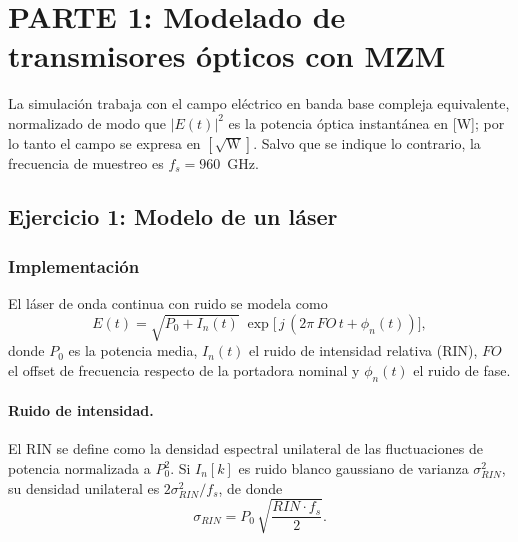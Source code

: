 
\section*{PARTE 1: Modelado de transmisores ópticos con MZM}

La simulación trabaja con el campo eléctrico en banda base compleja
equivalente, normalizado de modo que $|E(t)|^2$ es la potencia óptica
instantánea en [W]; por lo tanto el campo se expresa en $[\sqrt{\text{W}}]$.
Salvo que se indique lo contrario, la frecuencia de muestreo es
$f_s = 960$~GHz.

\subsection*{Ejercicio 1: Modelo de un láser}

\subsubsection*{Implementación}

El láser de onda continua con ruido se modela como
%
\begin{equation}
E(t) = \sqrt{P_0 + I_n(t)}\;\exp\!\big[\,j\,(2\pi\,FO\,t + \phi_n(t))\big],
\label{eq:ej1_laser}
\end{equation}
%
donde $P_0$ es la potencia media, $I_n(t)$ el ruido de intensidad relativa
(RIN), $FO$ el offset de frecuencia respecto de la portadora nominal y
$\phi_n(t)$ el ruido de fase.

\paragraph{Ruido de intensidad.}
El RIN se define como la densidad espectral unilateral de las fluctuaciones
de potencia normalizada a $P_0^2$. Si $I_n[k]$ es ruido blanco gaussiano
de varianza $\sigma_{RIN}^2$, su densidad unilateral es $2\sigma_{RIN}^2/f_s$,
de donde
%
\begin{equation}
\sigma_{RIN} = P_0\,\sqrt{\frac{RIN\cdot f_s}{2}}.
\label{eq:ej1_rin}
\end{equation}

